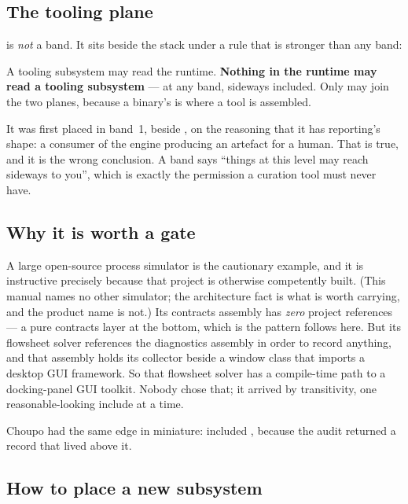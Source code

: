 \documentclass[11pt,a4paper]{article}
\begin{document}
\subsection{The tooling plane}

 is \emph{not} a band. It sits beside the stack under a rule
that is stronger than any band:

\begin{keyidea}
A tooling subsystem may read the runtime. \textbf{Nothing in the runtime may
read a tooling subsystem} --- at any band, sideways included. Only
 may join the two planes, because a binary's 
is where a tool is assembled.
\end{keyidea}

It was first placed in band~1, beside , on the reasoning that
it has reporting's shape: a consumer of the engine producing an artefact for a
human. That is true, and it is the wrong conclusion. A band says ``things at
this level may reach sideways to you'', which is exactly the permission a
curation tool must never have.

\subsection{Why it is worth a gate}

A large open-source process simulator is the cautionary example, and it is
instructive precisely because that project is otherwise competently built.
(This manual names no other simulator; the architecture fact is what is worth
carrying, and the product name is not.) Its contracts assembly has \emph{zero}
project references --- a pure contracts layer at the bottom, which is the
pattern  follows here. But its flowsheet solver references the
diagnostics assembly in order to record anything, and that assembly holds its
collector beside a window class that imports a desktop GUI framework. So that
flowsheet solver has a compile-time path to a docking-panel GUI toolkit.
Nobody chose that; it arrived by transitivity, one reasonable-looking include
at a time.

Choupo had the same edge in miniature:  included
, because the audit returned a record
that lived above it.

\subsection{How to place a new subsystem}
\end{document}
